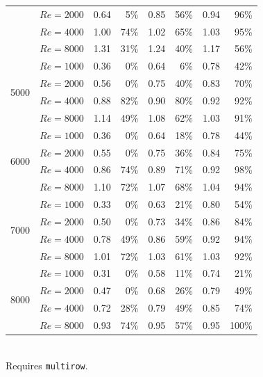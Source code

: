\begin{table}[t]
\begin{tabular}{lrrrrrrr}
     & $Re{=}2000$ & 0.64 & 5\% & 0.85 & 56\% & 0.94 & 96\% \\
     & $Re{=}4000$ & 1.00 & 74\% & 1.02 & 65\% & 1.03 & 95\% \\
     & $Re{=}8000$ & 1.31 & 31\% & 1.24 & 40\% & 1.17 & 56\% \\
    \midrule
    \multirow{4}{*}{5000} & $Re{=}1000$ & 0.36 & 0\% & 0.64 & 6\% & 0.78 & 42\% \\
     & $Re{=}2000$ & 0.56 & 0\% & 0.75 & 40\% & 0.83 & 70\% \\
     & $Re{=}4000$ & 0.88 & 82\% & 0.90 & 80\% & 0.92 & 92\% \\
     & $Re{=}8000$ & 1.14 & 49\% & 1.08 & 62\% & 1.03 & 91\% \\
    \midrule
    \multirow{4}{*}{6000} & $Re{=}1000$ & 0.36 & 0\% & 0.64 & 18\% & 0.78 & 44\% \\
     & $Re{=}2000$ & 0.55 & 0\% & 0.75 & 36\% & 0.84 & 75\% \\
     & $Re{=}4000$ & 0.86 & 74\% & 0.89 & 71\% & 0.92 & 98\% \\
     & $Re{=}8000$ & 1.10 & 72\% & 1.07 & 68\% & 1.04 & 94\% \\
    \midrule
    \multirow{4}{*}{7000} & $Re{=}1000$ & 0.33 & 0\% & 0.63 & 21\% & 0.80 & 54\% \\
     & $Re{=}2000$ & 0.50 & 0\% & 0.73 & 34\% & 0.86 & 84\% \\
     & $Re{=}4000$ & 0.78 & 49\% & 0.86 & 59\% & 0.92 & 94\% \\
     & $Re{=}8000$ & 1.01 & 72\% & 1.03 & 61\% & 1.03 & 92\% \\
    \midrule
    \multirow{4}{*}{8000} & $Re{=}1000$ & 0.31 & 0\% & 0.58 & 11\% & 0.74 & 21\% \\
     & $Re{=}2000$ & 0.47 & 0\% & 0.68 & 26\% & 0.79 & 49\% \\
     & $Re{=}4000$ & 0.72 & 28\% & 0.79 & 49\% & 0.85 & 74\% \\
     & $Re{=}8000$ & 0.93 & 74\% & 0.95 & 57\% & 0.95 & 100\% \\
    \bottomrule
  \end{tabular}
  \vspace{2pt}\\ \footnotesize Requires \texttt{multirow}.
\end{table}
